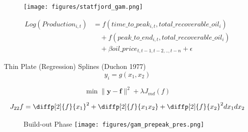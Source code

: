 \documentclass{beamer}
\begin{document}
\begin{frame}[plain]
	\begin{figure}
		\texttt{[image: figures/statfjord\_gam.png]}
		
		\label{statfjord_gam}
	\end{figure}
\end{frame}


\begin{frame}[plain]
	\begin{equation}
	\begin{split}
		Log(Production_{i,t})&=f(time\_to\_peak_{i,t}, total\_recoverable\_oil_i) \\
		& \quad + f(peak\_to\_end_{i,t}, total\_recoverable\_oil_i) \\
		& \quad + \beta oil\_price_{t,t-1, t-2,.., t-n} + \epsilon
	\end{split}
	\label{gam_price_eqn}
	\end{equation}
\end{frame}


\begin{frame}[plain]
	Thin Plate (Regression) Splines (Duchon 1977)
	\begin{equation}
	y_i = g(x_1, x_2)
	\end{equation}

	\begin{equation}
	\min \|\boldsymbol{y-f}\|^2 + \lambda J_{md}(f)
	\end{equation}

	\begin{equation}
	J_{22}{f}= \diffp[2]{f}{x_1}^2 + \diffp[2]{f}{{x_1}{x_2}} + \diffp[2]{f}{x_2}^2dx_1 dx_2
	\end{equation}
\end{frame}

\begin{frame}[plain]	
	\begin{figure}
	Build-out Phase
	\texttt{[image: figures/gam\_prepeak\_pres.png]}
	\label{gam_prepeak_print}
	\end{figure}
\end{frame}
\end{document}
